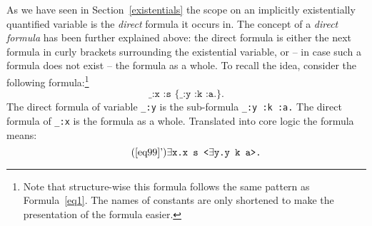 As we have seen in Section~\ref{existentials} the scope on an implicitly existentially quantified variable is the \emph{direct} formula it occurs in. 
The concept of a \emph{direct formula} has been further explained above: 
the direct formula is either the next formula in curly brackets surrounding the existential variable, or -- in case such a formula does not exist -- the formula as a whole.
To recall the idea, consider the following formula:\footnote{Note that structure-wise this formula follows the same pattern as Formula~\ref{eq1}. 
The names of constants are only shortened to
make the presentation of the formula easier.}
\begin{equation}
\texttt{\_:x :s \{\_:y :k :a.\}.} \label{eq99}
\end{equation}
The direct formula of variable \texttt{\_:y} is the sub-formula \texttt{\_:y :k :a.} The direct formula of \texttt{\_:x} is
the formula as a whole.
Translated into core logic the formula means:
\begin{equation}\tag{\ref{eq99}'}\label{eq99'}
 \exists \texttt{x.x s <}\exists \texttt{y.y k a>.}
\end{equation}


